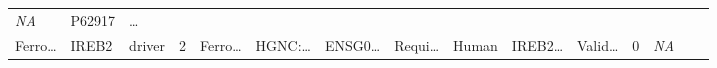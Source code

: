 \documentclass[
]{article}
\begin{document}
\begin{longtable}[]{@{}lllllllllllllll@{}}
\begin{minipage}[t]{0.05\columnwidth}
\emph{NA}\strut
\end{minipage} & \begin{minipage}[t]{0.05\columnwidth}\raggedright
P62917\strut
\end{minipage} & \begin{minipage}[t]{0.02\columnwidth}\raggedright
\ldots{}\strut
\end{minipage}\tabularnewline
\begin{minipage}[t]{0.05\columnwidth}\raggedright
Ferro\ldots{}\strut
\end{minipage} & \begin{minipage}[t]{0.04\columnwidth}\raggedright
IREB2\strut
\end{minipage} & \begin{minipage}[t]{0.04\columnwidth}\raggedright
driver\strut
\end{minipage} & \begin{minipage}[t]{0.02\columnwidth}\raggedright
2\strut
\end{minipage} & \begin{minipage}[t]{0.05\columnwidth}\raggedright
Ferro\ldots{}\strut
\end{minipage} & \begin{minipage}[t]{0.05\columnwidth}\raggedright
HGNC:\ldots{}\strut
\end{minipage} & \begin{minipage}[t]{0.05\columnwidth}\raggedright
ENSG0\ldots{}\strut
\end{minipage} & \begin{minipage}[t]{0.05\columnwidth}\raggedright
Requi\ldots{}\strut
\end{minipage} & \begin{minipage}[t]{0.04\columnwidth}\raggedright
Human\strut
\end{minipage} & \begin{minipage}[t]{0.05\columnwidth}\raggedright
IREB2\ldots{}\strut
\end{minipage} & \begin{minipage}[t]{0.05\columnwidth}\raggedright
Valid\ldots{}\strut
\end{minipage} & \begin{minipage}[t]{0.05\columnwidth}\raggedright
0\strut
\end{minipage} & \begin{minipage}[t]{0.05\columnwidth}\raggedright
\emph{NA}\strut
\end{minipage} & \begin{minipage}[t]{0.05\columnwidth}\raggedright

\end{minipage}
\end{longtable}
\end{document}

